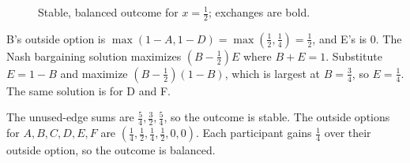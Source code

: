 \documentclass[newpages]{assignment}
\begin{document}
\begin{solution}
    \begin{figure}[H]
        \centering
        \caption{Stable, balanced outcome for \(x=\frac12\); exchanges are bold.}
        \label{fig:hw7-balanced-half}
    \end{figure}

    B's outside option is \(\max(1-A,1-D)=\max(\frac12,\frac14)=\frac12\), and E's is 0. The Nash bargaining solution maximizes $(B-\tfrac12)E$ where $B+E=1$. Substitute \(E=1-B\) and maximize \((B-\frac12)(1-B)\), which is largest at \(B=\frac34\), so \(E=\frac14\). The same solution is for D and F.

    The unused-edge sums are \(\frac54,\frac32,\frac54\), so the outcome is stable. The outside options for \(A,B,C,D,E,F\) are \((\frac14,\frac12,\frac14,\frac12,0,0)\). Each participant gains \(\frac14\) over their outside option, so the outcome is balanced.
\end{solution}
\end{document}
